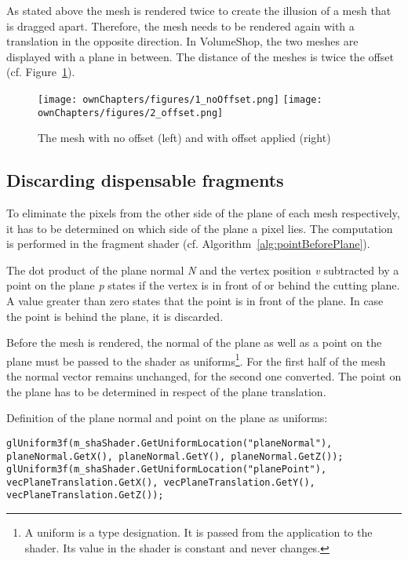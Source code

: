As stated above the mesh is rendered twice to create the illusion of a mesh that is dragged apart. Therefore, the mesh needs to be rendered again with a translation in the opposite direction. In VolumeShop, the two meshes are displayed with a plane in between. The distance of the meshes is twice the offset (cf. Figure~\ref{fig:offset}).

\begin{figure}%
\centering
\texttt{[image: ownChapters/figures/1\_noOffset.png]}%
\hspace{7.00mm}
\texttt{[image: ownChapters/figures/2\_offset.png]}%
\caption{The mesh with no offset (left) and with offset applied (right)}%
\label{fig:offset}%
\end{figure}

\subsection{Discarding dispensable fragments}
To eliminate the pixels from the other side of the plane of each mesh respectively, it has to be determined on which side of the plane a pixel lies. The computation is performed in the fragment shader (cf. Algorithm~\ref{alg:pointBeforePlane}).

\IncMargin{1em}
\begin{algorithm}
\SetAlgoNoLine
{}
\caption{The dot product of the plane normal \emph{N} and the vertex position \emph{v} subtracted by a point on the plane \emph{p} states if the vertex is in front of or behind the cutting plane. A value greater than zero states that the point is in front of the plane. In case the point is behind the plane, it is discarded.}
\BlankLine
\label{alg:pointBeforePlane}
\end{algorithm}
\DecMargin{1em}

Before the mesh is rendered, the normal of the plane as well as a point on the plane must be passed to the shader as uniforms\footnote{A uniform is a type designation. It is passed from the application to the shader. Its value in the shader is constant and never changes.}. 
For the first half of the mesh the normal vector remains unchanged, for the second one converted. The point on the plane has to be determined in respect of the plane translation.

Definition of the plane normal and point on the plane as uniforms:
\begin{lstlisting}
glUniform3f(m_shaShader.GetUniformLocation("planeNormal"), planeNormal.GetX(), planeNormal.GetY(), planeNormal.GetZ());
glUniform3f(m_shaShader.GetUniformLocation("planePoint"), vecPlaneTranslation.GetX(), vecPlaneTranslation.GetY(), vecPlaneTranslation.GetZ());
\end{lstlisting}

